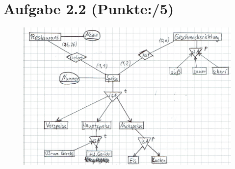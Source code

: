 \documentclass[11pt, a4paper]{article}
\newcommand{\blattnummer}{2}
\newcommand{\pp}{5}
\newcommand{\aufgabe}[2] {\section*{Aufgabe \blattnummer.#1 (Punkte:\qquad/#2)}}
\begin{document}
\aufgabe{2}{\pp}
\begin{figure}[h]
  \centering
  \includegraphics{a2.png}
\end{figure}\
\end{document}
